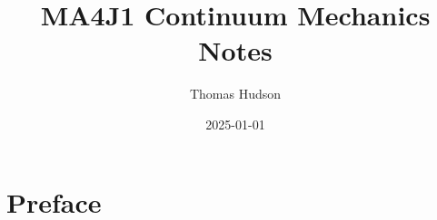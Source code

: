 \documentclass[
  letterpaper,
  DIV=11,
  numbers=noendperiod]{scrreprt}
\title{MA4J1 Continuum Mechanics Notes}
\author{Thomas Hudson}
\date{2025-01-01}
\renewcommand*\contentsname{Table of contents}
\newcommand\contentsname{Table of contents}
\theoremstyle{plain}
\theoremstyle{remark}
\begin{document}
\maketitle

\renewcommand*\contentsname{Table of contents}
{
\hypersetup{linkcolor=}
\setcounter{tocdepth}{2}
\tableofcontents
}


\chapter*{Preface}\label{preface}


\newcommand{\bfa}{{\boldsymbol{a}}}
\newcommand{\bfb}{{\boldsymbol{b}}}
\newcommand{\bfc}{{\boldsymbol{c}}}
\newcommand{\bfd}{{\boldsymbol{d}}}
\newcommand{\bfe}{{\boldsymbol{e}}}
\newcommand{\bff}{{\boldsymbol{f}}}
\newcommand{\bfg}{{\boldsymbol{g}}}
\newcommand{\bfh}{{\boldsymbol{h}}}
\newcommand{\bfi}{{\boldsymbol{i}}}
\newcommand{\bfj}{{\boldsymbol{j}}}
\newcommand{\bfk}{{\boldsymbol{k}}}
\newcommand{\bfl}{{\boldsymbol{l}}}
\newcommand{\bfm}{{\boldsymbol{m}}}
\newcommand{\bfn}{{\boldsymbol{n}}}
\newcommand{\bfo}{{\boldsymbol{o}}}
\newcommand{\bfp}{{\boldsymbol{p}}}
\newcommand{\bfq}{{\boldsymbol{q}}}
\newcommand{\bfr}{{\boldsymbol{r}}}
\newcommand{\bfs}{{\boldsymbol{s}}}
\newcommand{\bft}{{\boldsymbol{t}}}
\newcommand{\bfu}{{\boldsymbol{u}}}
\newcommand{\bfv}{{\boldsymbol{v}}}
\newcommand{\bfw}{{\boldsymbol{w}}}
\newcommand{\bfx}{{\boldsymbol{x}}}
\newcommand{\bfy}{{\boldsymbol{y}}}
\newcommand{\bfz}{{\boldsymbol{z}}}

\newcommand{\bfA}{{\boldsymbol{A}}}
\newcommand{\bfB}{{\boldsymbol{B}}}
\newcommand{\bfC}{{\boldsymbol{C}}}
\newcommand{\bfD}{{\boldsymbol{D}}}
\newcommand{\bfE}{{\boldsymbol{E}}}
\newcommand{\bfF}{{\boldsymbol{F}}}
\newcommand{\bfG}{{\boldsymbol{G}}}
\newcommand{\bfH}{{\boldsymbol{H}}}
\newcommand{\bfI}{{\boldsymbol{I}}}
\newcommand{\bfJ}{{\boldsymbol{J}}}
\newcommand{\bfK}{{\boldsymbol{K}}}
\newcommand{\bfL}{{\boldsymbol{L}}}
\newcommand{\bfM}{{\boldsymbol{M}}}
\newcommand{\bfN}{{\boldsymbol{N}}}
\newcommand{\bfO}{{\boldsymbol{O}}}
\newcommand{\bfP}{{\boldsymbol{P}}}
\newcommand{\bfQ}{{\boldsymbol{Q}}}
\newcommand{\bfR}{{\boldsymbol{R}}}
\newcommand{\bfS}{{\boldsymbol{S}}}
\newcommand{\bfT}{{\boldsymbol{T}}}
\newcommand{\bfU}{{\boldsymbol{U}}}
\newcommand{\bfV}{{\boldsymbol{V}}}
\newcommand{\bfW}{{\boldsymbol{W}}}
\newcommand{\bfX}{{\boldsymbol{X}}}
\newcommand{\bfY}{{\boldsymbol{Y}}}
\newcommand{\bfZ}{{\boldsymbol{Z}}}
\end{document}
